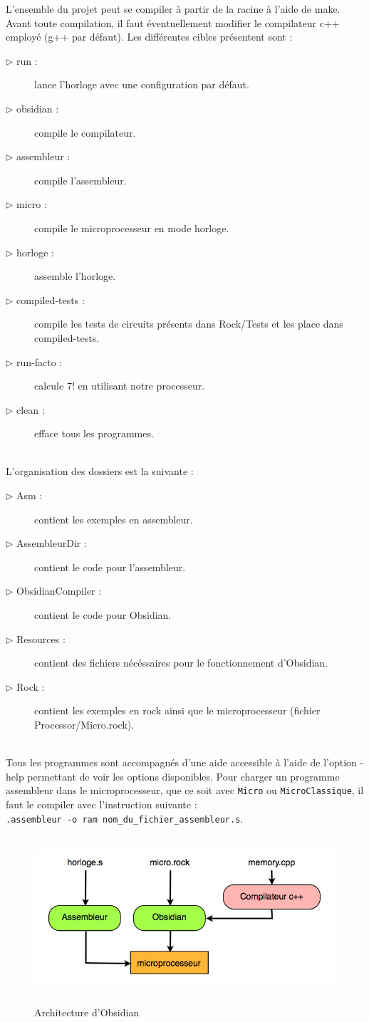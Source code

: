 \documentclass[13pt]{article}
\begin{document}
L'ensemble du projet peut se compiler à partir de la racine à l'aide de
make. Avant toute compilation, il faut éventuellement modifier le compilateur
c++ employé (g++ par défaut). Les différentes cibles présentent sont :
\begin{description}
\item[$\rhd$ run :] lance l'horloge avec une configuration par défaut.
\item[$\rhd$ obsidian :] compile le compilateur.
\item[$\rhd$ assembleur :] compile l'assembleur.
\item[$\rhd$ micro :] compile le microprocesseur en mode \og horloge\fg{}.
\item[$\rhd$ horloge :] assemble l'horloge.
\item[$\rhd$ compiled-tests :] compile les tests de circuits présents dans Rock/Tests
  et les place dans compiled-tests.
\item[$\rhd$ run-facto :] calcule 7! en utilisant notre processeur.
\item[$\rhd$ clean :] efface tous les programmes.
\end{description}
\text{}\\
L'organisation des dossiers est la suivante :
\begin{description}
\item[$\rhd$ Asm :] contient les exemples en assembleur.
\item[$\rhd$ AssembleurDir :] contient le code pour l'assembleur.
\item[$\rhd$ ObsidianCompiler :] contient le code pour Obsidian.
\item[$\rhd$ Resources :] contient des fichiers nécéssaires pour le fonctionnement
  d'Obsidian.
\item[$\rhd$ Rock :] contient les exemples en rock ainsi que le microprocesseur
  (fichier Processor/Micro.rock).
\end{description}
\text{}\\
Tous les programmes sont accompagnés d'une aide accessible à l'aide de l'option
-help permettant de voir les options disponibles. Pour charger un programme
assembleur dans le microprocesseur, que ce soit avec \texttt{Micro} ou
\texttt{MicroClassique}, il faut le compiler avec l'instruction suivante : \\
\texttt{.assembleur -o ram nom\_du\_fichier\_assembleur.s}.

\begin{figure}[!h]
\centering
\includegraphics[width=13.5cm,height=6.2cm]{exec.png}
\caption{Architecture d'Obsidian}
\label{Architecture d'Obsidian}
\end{figure}
\end{document}

